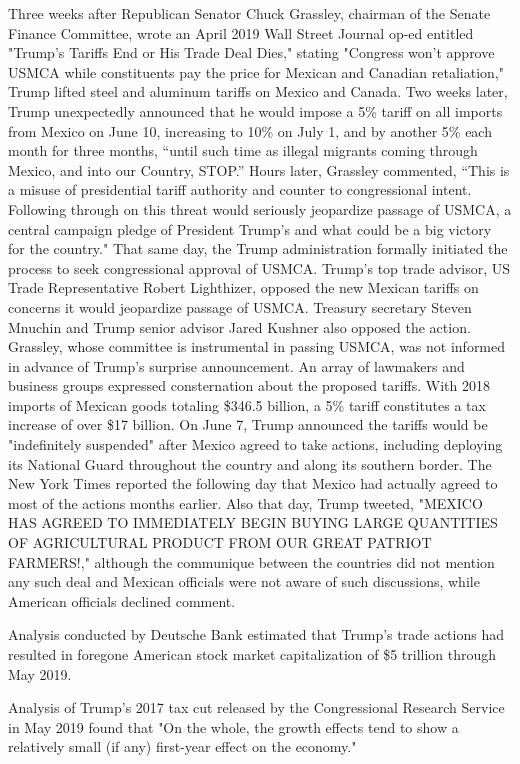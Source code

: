 Three weeks after Republican Senator Chuck Grassley, chairman of the
Senate Finance Committee, wrote an April 2019 Wall Street Journal op-ed
entitled "Trump's Tariffs End or His Trade Deal Dies," stating "Congress
won't approve USMCA while constituents pay the price for Mexican and
Canadian retaliation," Trump lifted steel and aluminum tariffs on Mexico
and Canada. Two weeks later, Trump unexpectedly announced that he would
impose a 5\% tariff on all imports from Mexico on June 10, increasing to
10\% on July 1, and by another 5\% each month for three months, ``until
such time as illegal migrants coming through Mexico, and into our
Country, STOP.'' Hours later, Grassley commented, ``This is a misuse of
presidential tariff authority and counter to congressional intent.
Following through on this threat would seriously jeopardize passage of
USMCA, a central campaign pledge of President Trump's and what could be
a big victory for the country." That same day, the Trump administration
formally initiated the process to seek congressional approval of USMCA.
Trump's top trade advisor, US Trade Representative Robert Lighthizer,
opposed the new Mexican tariffs on concerns it would jeopardize passage
of USMCA. Treasury secretary Steven Mnuchin and Trump senior advisor
Jared Kushner also opposed the action. Grassley, whose committee is
instrumental in passing USMCA, was not informed in advance of Trump's
surprise announcement. An array of lawmakers and business groups
expressed consternation about the proposed tariffs. With 2018 imports of
Mexican goods totaling \$346.5 billion, a 5\% tariff constitutes a tax
increase of over \$17 billion. On June 7, Trump announced the tariffs
would be "indefinitely suspended" after Mexico agreed to take actions,
including deploying its National Guard throughout the country and along
its southern border. The New York Times reported the following day that
Mexico had actually agreed to most of the actions months earlier. Also
that day, Trump tweeted, "MEXICO HAS AGREED TO IMMEDIATELY BEGIN BUYING
LARGE QUANTITIES OF AGRICULTURAL PRODUCT FROM OUR GREAT PATRIOT
FARMERS!," although the communique between the countries did not mention
any such deal and Mexican officials were not aware of such discussions,
while American officials declined comment.

Analysis conducted by Deutsche Bank estimated that Trump's trade actions
had resulted in foregone American stock market capitalization of \$5
trillion through May 2019.

Analysis of Trump's 2017 tax cut released by the Congressional Research
Service in May 2019 found that "On the whole, the growth effects tend to
show a relatively small (if any) first-year effect on the economy."

